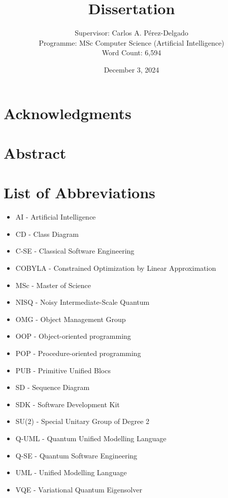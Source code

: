 \documentclass{article}
\title{Dissertation}
\author{Supervisor: Carlos A. Pérez-Delgado\\ Programme: MSc Computer Science (Artificial Intelligence) \\ Word Count: 6,594}
\date{December 3, 2024}
\begin{document}
\maketitle

\thispagestyle{empty} %

\newpage
\setcounter{page}{1}

\section*{Acknowledgments}
\newpage

\section*{Abstract}
\newpage

\listoffigures
\newpage

\listoftables
\newpage

\section*{List of Abbreviations}
\begin{itemize}
    \item AI - Artificial Intelligence
    \item CD - Class Diagram
    \item C-SE - Classical Software Engineering
    \item COBYLA - Constrained Optimization by Linear Approximation
    \item MSc - Master of Science
    \item NISQ - Noisy Intermediate-Scale Quantum
    \item OMG - Object Management Group
    \item OOP - Object-oriented programming
    \item POP - Procedure-oriented programming
    \item PUB - Primitive Unified Blocs
    \item SD - Sequence Diagram
    \item SDK - Software Development Kit
    \item SU(2) - Special Unitary Group of Degree 2
    \item Q-UML - Quantum Unified Modelling Language
    \item Q-SE - Quantum Software Engineering
    \item UML - Unified Modelling Language
    \item VQE - Variational Quantum Eigensolver
\end{itemize}
\newpage
\end{document}
